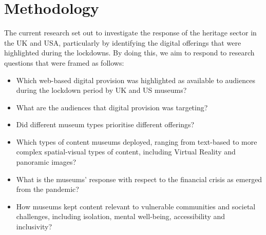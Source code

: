 \documentclass{egpubl}
\begin{document}
\section{Methodology}
\label{meth}


The current research set out to investigate the response of the heritage sector in the UK and USA, particularly by identifying the digital offerings that were highlighted during the lockdowns. By doing this, we aim to respond to research questions that were framed as follows:

\begin{itemize}
\item Which web-based digital provision was highlighted as available to audiences during the lockdown period by UK and US museums? 
\item What are the audiences that digital provision was targeting?
\item Did different museum types prioritise different offerings?
\item Which types of content museums deployed, ranging from text-based to more complex spatial-visual types of content, including Virtual Reality and panoramic images?
\item What is the museums' response with respect to the financial crisis as emerged from the pandemic?
\item How museums kept content relevant to vulnerable communities and societal challenges, including isolation, mental well-being, accessibility and inclusivity?
\end{itemize}
\end{document}
